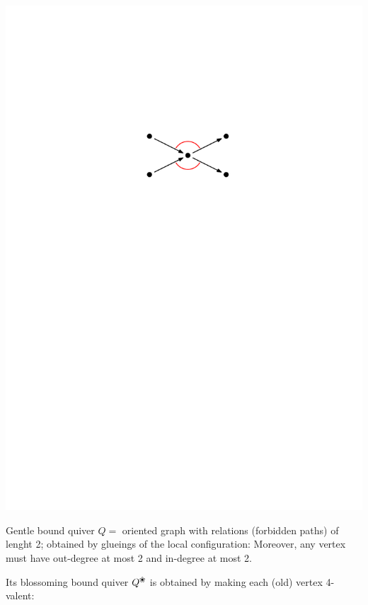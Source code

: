 \documentclass[portrait,final,a0paper,fontscale=0.25]{baposter}
\newcommand{\blossom}{^\text{\ding{96}}} %
\theoremstyle{definition}
\begin{document}
\begin{poster}
{\hspace*{7.5cm}\includegraphics[scale=.35]{GentleCondition}

\vspace*{-1cm}
\begin{minipage}{7.2cm}
{\color{green} Gentle bound quiver} $Q =$ oriented graph with relations (forbidden paths) of lenght 2; obtained by glueings of the local configuration:
Moreover, any vertex must have out-degree at most 2 and in-degree at most 2.

\medskip

Its {\color{green} blossoming bound quiver} $Q\blossom$ is obtained by making each (old) vertex 4-valent:
\end{minipage}

}
\end{poster}
\end{document}
